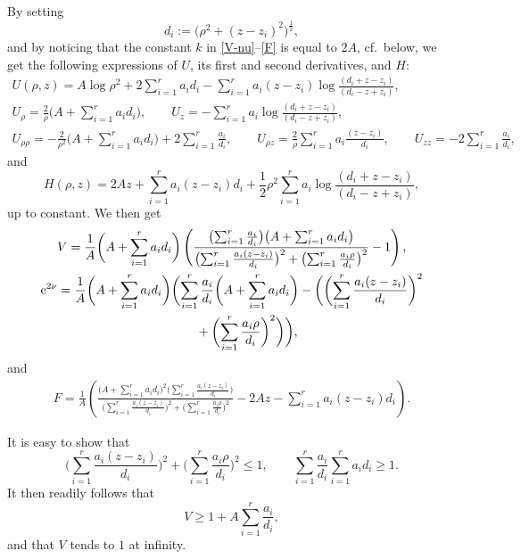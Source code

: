 \documentclass[pdftex]{sigma}
\numberwithin{equation}{section}
\begin{document}
By setting
\[ d_i := \big(\rho ^2 + (z - z_i)^2\big)^{\frac{1}{2}}, \]
and by noticing that the constant $k$ in \eqref{V-nu}--\eqref{F} is equal to $2 A$, cf.\ below, we get the following expressions of $U$, its first and second derivatives, and $H$:
\begin{gather} U (\rho, z) = A \log{\rho ^2} + 2 \sum _{i = 1}^r a_i d_i - \sum _{i = 1}^r a _i (z - z_i) \log{\frac{(d_i + z - z_i)}{(d_i - z + z_i)}},\label{U-def} \\
U_{\rho} = \frac{2}{\rho} \bigg(A + \sum _{i = 1}^r a_i d_i\bigg), \qquad U_z = - \sum _{i = 1}^r a_i \log{\frac{(d_i + z - z_i)}{(d_i - z + z_i)}}, \label{U-rho-z} \\
 U_{\rho \rho} = - \frac{2}{\rho ^2} \bigg(A + \sum _{i = 1} ^r a _i d _i\bigg) + 2 \sum _{i = 1} ^r \frac{a_i}{d_i}, \qquad U_{\rho z} = \frac{2}{\rho} \sum _{i = 1} ^r a_i \frac{(z - z_i)}{d_i}, \qquad
U _{z z} = - 2 \sum _{i = 1} ^r \frac{a _i}{d_i},\nonumber%
 \end{gather}
and
\[%
H (\rho, z) = 2 A z + \sum _{i = 1}^r a _i (z - z_i) d _i + \frac{1}{2} \rho ^2 \sum_{i = 1}^r a _i \log{\frac{(d_i + z - z_i)}{(d_i - z + z_i)}}, \]
up to constant.
We then get
\begin{gather}
 V = \frac{1}{A} \biggl(A + \sum _{i = 1} ^r a_i d_i\biggr) \left(\frac{\bigl(\sum _{i = 1}^r \frac{a_i}{d_i}\bigr) \bigl(A + \sum _{i = 1} ^r a_i d_i\bigr)}{\bigl(\sum _{i = 1}^r \frac{a _i (z - z_i)}{d_i}\bigr) ^2 + \bigl(\sum _{i = 1}^r \frac{a _i \rho}{d_i}\bigr)^2} - 1\right), \label{V-def} \\
 {\rm e}^{2 \nu} = \frac{1}{A} \biggl(A + \sum _{i = 1} ^r a_i d_i\biggr) \biggl(\sum _{i = 1}^r \frac{a_i}{d_i} \biggl(A + \sum _{i = 1} ^r a_i d_i\biggr) - \biggl(\biggl(\sum _{i = 1}^r \frac{a _i (z - z_i)}{d_i}\biggr) ^2 \nonumber\\
 \hphantom{{\rm e}^{2 \nu} =}{}+ \biggl(\sum _{i = 1}^r \frac{a _i \rho}{d_i}\biggr)^2\biggr)\biggr), \label{nu-def}
 \end{gather}
and
\begin{gather} \label{F-def} F = \frac{1}{A} \left(\frac{\bigl(A + \sum _{i = 1} ^r a_i d_i\bigr)^2 \bigl(\sum _{i = 1}^r \frac{a _i (z - z_i)}{d_i}\bigr)}{\bigl(\sum _{i = 1}^r \frac{a _i (z - z_i)}{d_i}\bigr) ^2 + \bigl(\sum _{i = 1}^r \frac{a _i \rho}{d_i}\bigr)^2} - 2 A z - \sum _{i = 1}^r a_i (z - z_i) d_i\right). \end{gather}

It is easy to show that
\[\bigg(\sum _{i = 1} ^r \frac{a _i (z - z_i)}{d_i}\bigg)^2 + \bigg(\sum _{i = 1} ^r \frac{a _i \rho}{d_i}\bigg)^2 \leq 1,
\qquad \sum _{i = 1} ^r \frac{a_i}{d_i} \sum _{i = 1} ^r a _i d _i \geq 1.
\]
It then readily follows that
\[ V \geq 1 + A \sum _{i = 1} ^r \frac{a_i}{d_i}, \]
and that $V$ tends to $1$ at infinity.
\end{document}
